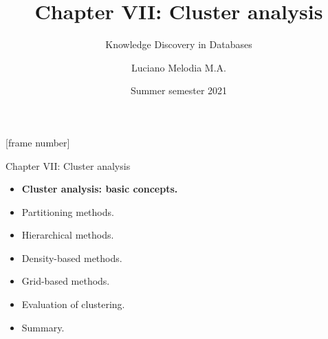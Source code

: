 \documentclass[aspectratio=169,t,xcolor=dvipsnames]{beamer}
\title[KDD]{Chapter VII: Cluster analysis}
\subtitle{Knowledge Discovery in Databases}
\author[L.~Melodia]{Luciano Melodia M.A.}
\institute[Department]{Evolutionary Data Management, Friedrich-Alexander University Erlangen-Nürnberg}
\date{Summer semester 2021}
\begin{document}
  \maketitle

  {
    [frame number]
    \begin{frame}{Chapter VII: Cluster analysis}
        \begin{itemize}
            \item \textbf{Cluster analysis: basic concepts.}
            \item Partitioning methods.
            \item Hierarchical methods.
            \item Density-based methods.
            \item Grid-based methods.
            \item Evaluation of clustering.
            \item Summary.
        \end{itemize}
    \end{frame}
  }
\end{document}
